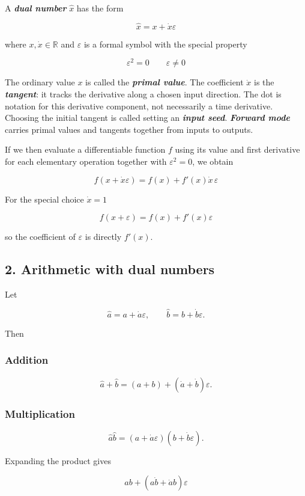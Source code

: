 \documentclass{course_sheet}
\begin{document}
A \textbf{\textit{dual number}} $\hat{x}$ has the form

\[
\hat{x} = x + \dot{x}\varepsilon
\]

where $x,\dot{x}\in\mathbb{R}$ and $\varepsilon$ is a formal symbol with the special property

\[
\varepsilon^2 = 0
\qquad
\varepsilon \neq 0
\]

The ordinary value $x$ is called the \textbf{\textit{primal value}}. The coefficient $\dot{x}$ is the \textbf{\textit{tangent}}: it tracks the derivative along a chosen input direction. The dot is notation for this derivative component, not necessarily a time derivative. Choosing the initial tangent is called setting an \textbf{\textit{input seed}}. \textbf{\textit{Forward mode}} carries primal values and tangents together from inputs to outputs.

If we then evaluate a differentiable function $f$ using its value and first derivative for each elementary operation together with $\varepsilon^2=0$, we obtain

\[
f(x+\dot{x}\varepsilon)
= f(x) + f'(x)\dot{x}\,\varepsilon
\]

For the special choice $\dot{x}=1$

\[
f(x+\varepsilon)=f(x)+f'(x)\varepsilon
\]

so the coefficient of $\varepsilon$ is directly $f'(x)$.

\subsection*{2. Arithmetic with dual numbers}
Let

\[
\hat{a}=a+\dot{a}\varepsilon,
\qquad
\hat{b}=b+\dot{b}\varepsilon.
\]

Then

\subsubsection*{Addition}
\[
\hat{a}+\hat{b}
=(a+b)+(\dot{a}+\dot{b})\varepsilon.
\]

\subsubsection*{Multiplication}
\[
\hat{a}\hat{b}
=(a+\dot{a}\varepsilon)(b+\dot{b}\varepsilon).
\]

Expanding the product gives

\[
ab+(a\dot{b}+\dot{a}b)\varepsilon
\]
\end{document}
